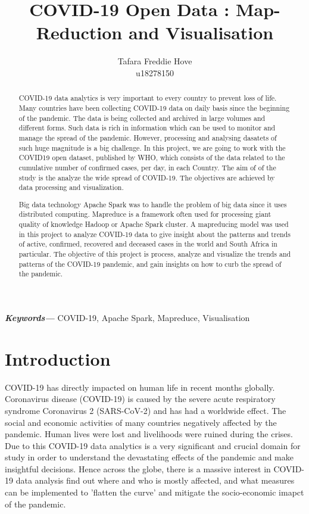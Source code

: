 \documentclass[12pt,letterpaper, twoside]{article}
\title{COVID-19 Open Data : Map-Reduction and Visualisation}
\author{Tafara Freddie Hove \\
        \small u18278150 \\
}
\date{}
\providecommand{\keywords}[1]
{
  \small	
  \textbf{\textit{Keywords---}} #1 
}
\begin{document}
\maketitle

\begin{abstract}
COVID-19 data analytics is very important to every country to prevent loss of life. Many countries have been collecting COVID-19 data  on daily basis since the beginning of the pandemic. The data is being collected and archived in large volumes and different forms. Such data is rich in information which can be used to monitor and manage the spread of the pandemic. However, processing and analysing dasatets of such huge magnitude is a big challenge. In this project, we are going to work with the COVID19 open dataset, published by WHO, which consists of the data related to the cumulative number of confirmed cases, per day, in each Country. The aim of of the study is the analyze the wide spread of COVID-19. The objectives are achieved by data processing and visualization. 

Big data technology Apache Spark was to handle the problem of big data since it uses distributed computing. Mapreduce is a framework often used for processing giant quality of knowledge Hadoop or Apache Spark cluster. A mapreducing model was used in this project to analyze COVID-19 data to give insight about the patterns and trends of active, confirmed, recovered and deceased cases in the world and South Africa in particular. The objective of this project is process, analyze and visualize the trends and patterns of the COVID-19 pandemic, and gain insights on how to curb the spread of the pandemic.

\end{abstract}\hspace{10pt}
\keywords{COVID-19, Apache Spark, Mapreduce, Visualisation}

\section{Introduction}
COVID-19 has directly impacted on human life in recent months globally. Coronavirus disease (COVID-19) is caused by the severe acute respiratory syndrome Coronavirus 2 (SARS-CoV-2) and has had a worldwide effect. The social and economic activities of many countries negatively affected by the pandemic. Human lives were lost and livelihoods were ruined during the crises.  Due to this COVID-19 data analytics is a very significant and crucial domain for study in order to understand the devastating effects of the pandemic and make insightful decisions. Hence across the globe, there is a massive interest in COVID-19 data analysis find out where and who is mostly affected, and what measures can be implemented to 'flatten the curve' and mitigate the socio-economic imapct of the pandemic. 
\end{document}
